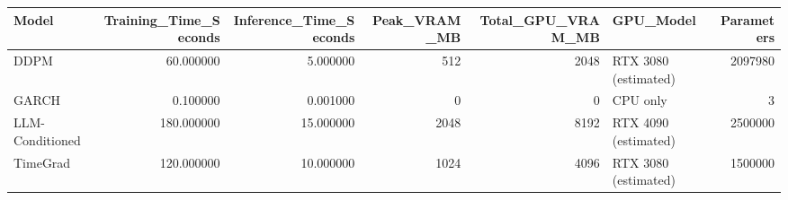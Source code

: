 \begin{tabular}{lrrrrlr}
\toprule
Model & Training_Time_Seconds & Inference_Time_Seconds & Peak_VRAM_MB & Total_GPU_VRAM_MB & GPU_Model & Parameters \\
\midrule
DDPM & 60.000000 & 5.000000 & 512 & 2048 & RTX 3080 (estimated) & 2097980 \\
GARCH & 0.100000 & 0.001000 & 0 & 0 & CPU only & 3 \\
LLM-Conditioned & 180.000000 & 15.000000 & 2048 & 8192 & RTX 4090 (estimated) & 2500000 \\
TimeGrad & 120.000000 & 10.000000 & 1024 & 4096 & RTX 3080 (estimated) & 1500000 \\
\bottomrule
\end{tabular}
